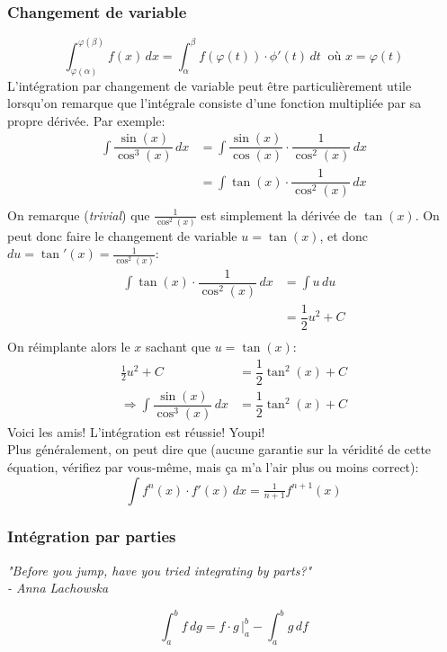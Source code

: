 \documentclass{article}
\begin{document}
\subsubsection{Changement de variable}
\begin{equation}
	\boxed{ \int_{\varphi(\alpha)}^{\varphi(\beta)} f(x) \, dx = \int_\alpha^\beta f(\varphi(t)) \cdot \phi'(t) \, dt } \: \text{ où } x= \varphi(t)
\end{equation}
L'intégration par changement de variable peut être particulièrement utile lorsqu'on remarque que l'intégrale consiste d'une fonction multipliée par sa propre dérivée. Par exemple: 
\begin{align*}
	\int \dfrac{\sin(x)}{\cos^3(x)} \, dx 	&= \int \dfrac{\sin(x)}{\cos(x)} \cdot \dfrac{1}{\cos^2(x)} \, dx \\
												&= \int \tan(x) \cdot \dfrac{1}{\cos^2(x)} \, dx \\
\end{align*}
On remarque (\emph{trivial}) que \(\frac{1}{\cos^2(x)}\) est simplement la dérivée de \(\tan(x)\). On peut donc faire le changement de variable \(u = \tan(x)\), et donc \(du = \tan'(x) = \frac{1}{\cos^2(x)}\):
\begin{align*}
	\int \tan(x) \cdot \dfrac{1}{\cos^2(x)} \, dx 	&= \int u \, du \\
															&= \dfrac{1}{2}u^2 + C \\
\end{align*}
On réimplante alors le \(x\) sachant que \(u = \tan(x)\):
\begin{align*}
	\frac{1}{2}u^2 + C &= \dfrac{1}{2}\tan^2(x) + C \\
	\Rightarrow \int \dfrac{\sin(x)}{\cos^3(x)} \, dx &= \dfrac{1}{2}\tan^2(x) + C
\end{align*}
Voici les amis! L'intégration est réussie! Youpi! \\
Plus généralement, on peut dire que (aucune garantie sur la véridité de cette équation, vérifiez par vous-même, mais ça m'a l'air plus ou moins correct):
\begin{equation*}
	\int f^n(x) \cdot f'(x) \, dx = \tfrac{1}{n+1}f^{n+1}(x)
\end{equation*}

\subsubsection{Intégration par parties}
\begin{center}
	\emph{"Before you jump, have you tried integrating by parts?" \\ \qquad \qquad - Anna Lachowska}
\end{center}
\begin{equation}
	\boxed{ \int_a^b f \, dg = f \cdot g \, \bigg|_a^b - \int_a^b g\, df }
\end{equation}
\end{document}
